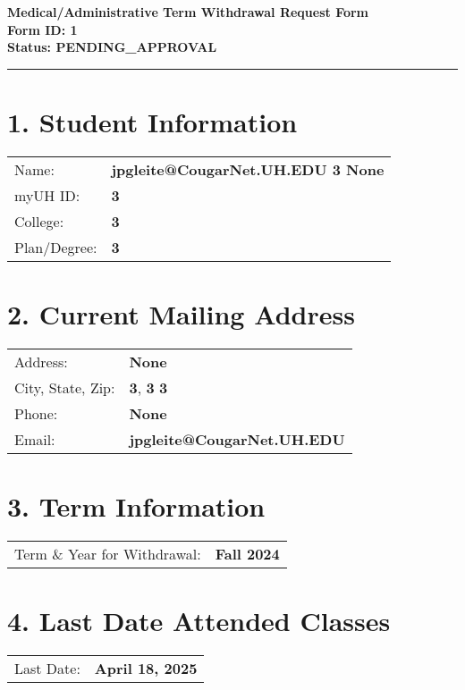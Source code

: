 \documentclass[12pt]{article}
\begin{document}
\begin{center}
  \textbf{\Large Medical/Administrative Term Withdrawal Request Form}\\[0.2cm]
  \textbf{Form ID: 1}\\[0.2cm]
  \textbf{Status: PENDING_APPROVAL}
\end{center}

\hrule
\vspace{0.5cm}

\section*{1. Student Information}
\begin{tabular}{ll}
Name: & \textbf{jpgleite@CougarNet.UH.EDU 3 None} \\
myUH ID: & \textbf{3} \\
College: & \textbf{3} \\
Plan/Degree: & \textbf{3} \\
\end{tabular}

\vspace{0.5cm}

\section*{2. Current Mailing Address}
\begin{tabular}{ll}
Address: & \textbf{None} \\
City, State, Zip: & \textbf{3}, \textbf{3} \textbf{3} \\
Phone: & \textbf{None} \\
Email: & \textbf{jpgleite@CougarNet.UH.EDU} \\
\end{tabular}

\vspace{0.5cm}

\section*{3. Term Information}
\begin{tabular}{ll}
Term \& Year for Withdrawal: & \textbf{Fall 2024} \\
\end{tabular}

\vspace{0.5cm}

\section*{4. Last Date Attended Classes}
\begin{tabular}{ll}
Last Date: & \textbf{April 18, 2025} \\
\end{tabular}
\end{document}
